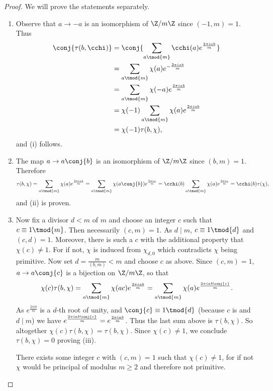         \begin{proof}
          We will prove the statements separately.
          \begin{enumerate}[label=(\roman*)]
            \item Observe that $a \to -a$ is an isomorphism of $\Z/m\Z$ since $(-1,m) = 1$. Thus
            \begin{align*}
              \conj{\tau(b,\cchi)} &= \conj{\sum_{a \tmod{m}}\cchi(a)e^{\frac{2\pi iab}{m}}} \\
              &= \sum_{a \tmod{m}}\chi(a)e^{-\frac{2\pi iab}{m}} \\
              &= \sum_{a \tmod{m}}\chi(-a)e^{\frac{2\pi iab}{m}} \\
              &= \chi(-1)\sum_{a \tmod{m}}\chi(a)e^{\frac{2\pi iab}{m}} \\
              &= \chi(-1)\tau(b,\chi),
            \end{align*}
            and (i) follows.
            \item The map $a \to a\conj{b}$ is an isomorphism of $\Z/m\Z$ since $(b,m) = 1$. Therefore
            \[
              \tau(b,\chi) = \sum_{a \tmod{m}}\chi(a)e^{\frac{2\pi iab}{m}} = \sum_{a \tmod{m}}\chi(a\conj{b})e^{\frac{2\pi ia}{m}} = \cchi(b)\sum_{a \tmod{m}}\chi(a)e^{\frac{2\pi ia}{m}} = \cchi(b)\tau(\chi),
            \]
            and (ii) is proven.
            \item Now fix a divisor $d < m$ of $m$ and choose an integer $c$ such that $c \equiv 1 \tmod{m}$. Then necessarily $(c,m) = 1$. As $d \mid m$, $c \equiv 1 \tmod{d}$ and $(c,d) = 1$. Moreover, there is such a $c$ with the additional property that $\chi(c) \neq 1$. For if not, $\chi$ is induced from $\chi_{d,0}$ which contradicts $\chi$ being primitive. Now set $d = \frac{m}{(b,m)} < m$ and choose $c$ as above. Since $(c,m) = 1$, $a \to a\conj{c}$ is a bijection on $\Z/m\Z$, so that
            \[
              \chi(c)\tau(b,\chi) = \sum_{a \tmod{m}}\chi(ac)e^{\frac{2\pi iab}{m}} = \sum_{a \tmod{m}}\chi(a)e^{\frac{2\pi iab\conj{c}}{m}}.
            \]
            As $e^{\frac{2\pi ib}{m}}$ is a $d$-th root of unity, and $\conj{c} \equiv 1 \tmod{d}$ (because $c$ is and $d \mid m$) we have $e^{\frac{2\pi iab\conj{c}}{m}} = e^{\frac{2\pi iab}{m}}$. Thus the last sum above is $\tau(b,\chi)$. So altogether $\chi(c)\tau(b,\chi) = \tau(b,\chi)$. Since $\chi(c) \neq 1$, we conclude $\tau(b,\chi) = 0$ proving (iii).

            There exists some integer $c$ with $(c,m) = 1$ such that $\chi(c) \neq 1$, for if not $\chi$ would be principal of modulus $m \ge 2$ and therefore not primitive.


\end{enumerate}
\end{proof}
